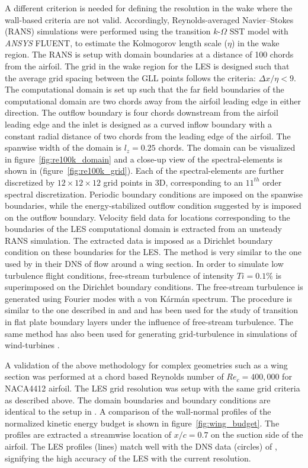A different criterion is needed for defining the resolution in the wake where the wall-based criteria are not valid. Accordingly, Reynolds-averaged Navier--Stokes (RANS) simulations were performed using the transition $k$-$\Omega$ SST model \citep{langtry09} with \textit{ANSYS}\textsuperscript{\textregistered} FLUENT, to estimate the Kolmogorov length scale ($\eta$) in the wake region. The RANS is setup with domain boundaries at a distance of 100 chords from the airfoil. The grid in the wake region for the LES is designed such that the average grid spacing between the GLL points follows the criteria: $\Delta x/\eta < 9$. The computational domain is set up such that the far field boundaries of the computational domain are two chords away from the airfoil leading edge in either direction. The outflow boundary is four chords downstream from the airfoil leading edge and the inlet is designed as a curved inflow boundary with a constant radial distance of two chords from the leading edge of the airfoil. The spanwise width of the domain is $l_{z}=0.25$ chords. The domain can be visualized in figure~\ref{fig:re100k_domain} and a close-up view of the spectral-elements is shown in (figure~\ref{fig:re100k_grid}). Each of the spectral-elements are further discretized by $12\times12\times12$ grid points in 3D, corresponding to an $11^{th}$ order spectral discretization. Periodic boundary conditions are imposed on the spanwise boundaries, while the energy-stabilized outflow condition suggested by \cite{dong2014} is imposed on the outflow boundary. Velocity field data for locations corresponding to the boundaries of the LES computational domain is extracted from an unsteady RANS simulation. The extracted data is imposed as a Dirichlet boundary condition on these boundaries for the LES. The method is very similar to the one used by \cite{hosseini16} in their DNS of flow around a wing section. In order to simulate low turbulence flight conditions, free-stream turbulence of intensity $Ti=0.1\%$ is superimposed on the Dirichlet boundary conditions. The free-stream turbulence is generated using Fourier modes with a von K\'arm\'an spectrum. The procedure is similar to the one described in \cite{schlatterdiploma,brandt04} and \cite{schlatter08} and has been used for the study of transition in flat plate boundary layers under the influence of free-stream turbulence. The same method has also been used for generating grid-turbulence in simulations of wind-turbines \citep{kleusberglicenciate}.

A validation of the above methodology for complex geometries such as a wing section was performed at a chord based Reynolds number of $Re_{c}=400,000$ for NACA4412 airfoil. The LES grid resolution was setup with the same grid criteria as described above. The domain boundaries and boundary conditions are identical to the setup in \cite{hosseini16}. A comparison of the wall-normal profiles of the normalized kinetic energy budget is shown in figure~\ref{fig:wing_budget}. The profiles are extracted a streamwise location of $x/c=0.7$ on the suction side of the airfoil. The LES profiles (lines) match well with the DNS data (circles) of \cite{hosseini16}, signifying the high accuracy of the LES with the current resolution.

